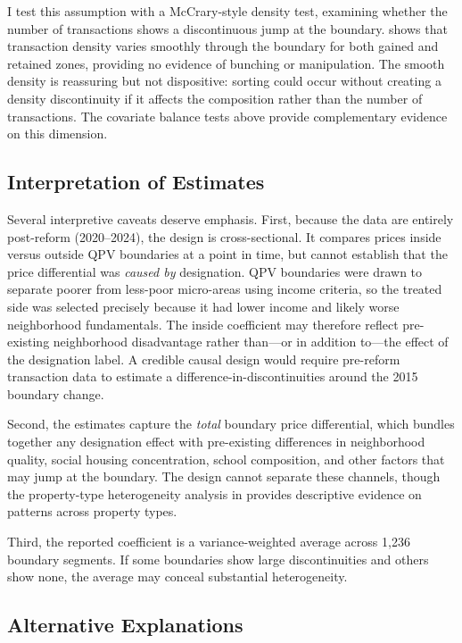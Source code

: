 \documentclass[12pt]{article}
\begin{document}
I test this assumption with a McCrary-style density test, examining whether the number of transactions shows a discontinuous jump at the boundary.  shows that transaction density varies smoothly through the boundary for both gained and retained zones, providing no evidence of bunching or manipulation. The smooth density is reassuring but not dispositive: sorting could occur without creating a density discontinuity if it affects the composition rather than the number of transactions. The covariate balance tests above provide complementary evidence on this dimension.

\subsection{Interpretation of Estimates}

Several interpretive caveats deserve emphasis. First, because the data are entirely post-reform (2020--2024), the design is cross-sectional. It compares prices inside versus outside QPV boundaries at a point in time, but cannot establish that the price differential was \textit{caused by} designation. QPV boundaries were drawn to separate poorer from less-poor micro-areas using income criteria, so the treated side was selected precisely because it had lower income and likely worse neighborhood fundamentals. The inside coefficient may therefore reflect pre-existing neighborhood disadvantage rather than---or in addition to---the effect of the designation label. A credible causal design would require pre-reform transaction data to estimate a difference-in-discontinuities around the 2015 boundary change.

Second, the estimates capture the \textit{total} boundary price differential, which bundles together any designation effect with pre-existing differences in neighborhood quality, social housing concentration, school composition, and other factors that may jump at the boundary. The design cannot separate these channels, though the property-type heterogeneity analysis in  provides descriptive evidence on patterns across property types.

Third, the reported coefficient is a variance-weighted average across 1,236 boundary segments. If some boundaries show large discontinuities and others show none, the average may conceal substantial heterogeneity.

\subsection{Alternative Explanations}
\end{document}
